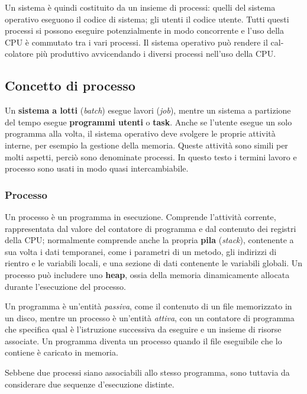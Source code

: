 \documentclass[11pt,a4paper]{article}
\begin{document}
Un sistema è quindi costituito da un insieme di processi: quelli del
sistema operativo eseguono il codice di sistema; gli utenti il codice utente. Tutti questi pro­cessi si possono eseguire potenzialmente in modo concorrente e l'uso della CPU è commutato tra i vari processi. Il sistema operativo può rendere il cal­colatore più produttivo avvicendando i diversi processi nell'uso della CPU.

\subsection{Concetto di processo}
Un \textbf{sistema a lotti} (\emph{batch}) esegue lavori (\emph{job}), mentre un sistema a partizione del tem­po esegue \textbf{programmi utenti} o \textbf{task}. Anche se l'utente esegue un solo programma alla volta, il sistema operativo deve svolge­re le proprie attività interne, per esempio la gestione della memoria. Queste attività sono si­mili per molti aspetti, perciò sono denominate processi.
In questo testo i termini lavoro e processo sono usati in modo quasi intercambiabile.

\subsubsection{Processo}
Un processo è un programma in esecuzione. Comprende l'attività corrente,
rappresentata dal valore del contatore di programma e dal contenuto dei registri della CPU;
normalmente comprende anche la propria \textbf{pila} (\emph{stack}), contenente a sua volta i dati tempo­ranei, come i parametri di un metodo, gli indirizzi di rientro e le variabili locali, e una sezio­ne di dati contenente le variabili globali. Un processo può includere uno \textbf{heap}, ossia della
memoria dinamicamente allocata durante l'esecuzione del processo.

Un programma è un'enti­tà \emph{passiva}, come il contenuto di un file memorizzato in un disco, mentre un processo è un'en­tità \emph{attiva}, con un contatore di programma che specifica qual è l'istruzione successiva da ese­guire e un insieme di risorse associate. Un programma diventa un processo quando il file
eseguibile che lo contiene è caricato in memoria.

Sebbene due processi siano associabili allo stesso programma, sono tuttavia da consi­derare due sequenze d'esecuzione distinte.
\end{document}
